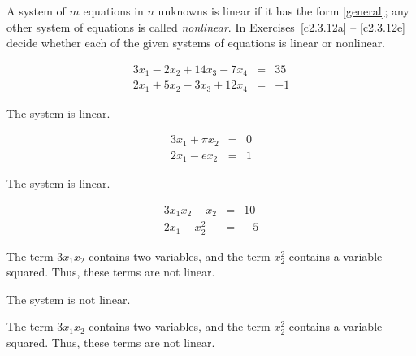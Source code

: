 \documentclass{ximera}
\begin{document}
\noindent A system of $m$ equations in $n$ unknowns is linear if it has
the form \eqref{general}; any other system of equations is called 
{\em nonlinear\/}.   In Exercises~\ref{c2.3.12a} -- 
\ref{c2.3.12e} decide whether each of the given systems of equations 
is linear or nonlinear.
\begin{exercise} \label{c2.3.12a}
\[
\begin{array}{rcl}
3x_1 - 2x_2 +14x_3-7x_4 & = & 35\\
2x_1 + 5x_2 - 3x_3 + 12x_4 & = & -1
\end{array}
\]
\begin{multipleChoice}
\end{multipleChoice}

\begin{solution}
\ans The system is linear.

\end{solution}
\end{exercise}
\begin{exercise} \label{c2.3.12b}
\[
\begin{array}{rcl}
3x_1 + \pi x_2  & = & 0\\
2x_1 - e x_2    & = & 1
\end{array}
\]
\begin{multipleChoice}
\end{multipleChoice}

\begin{solution}
\ans The system is linear.

\end{solution}
\end{exercise}
\begin{exercise} \label{c2.3.12c}
\[
\begin{array}{rcl}
3x_1x_2 -x_2  & = & 10\\
2x_1 -   x_2^2    & = & -5
\end{array}
\]
\begin{multipleChoice}
\end{multipleChoice}
\begin{hint}
  The term $3x_1x_2$ contains two variables, and the term $x_2^2$
contains a variable squared.  Thus, these terms are not linear.
\end{hint}

\begin{solution}
\ans The system is not linear.

\soln The term $3x_1x_2$ contains two variables, and the term $x_2^2$
contains a variable squared.  Thus, these terms are not linear.

\end{solution}
\end{exercise}
\end{document}
